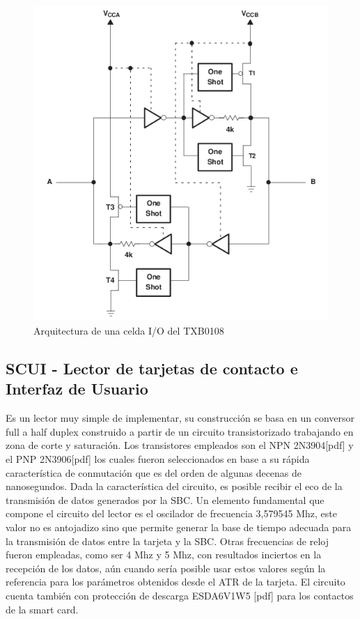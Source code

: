 \bigskip
\bigskip
\begin{figure}[H]
\centering
  \begin{center}
  \includegraphics[scale=.4]{Imagenes/TXB0108.png} 
  \end{center}
  \caption{Arquitectura de una celda I/O del TXB0108}\label{Fig:Celda_TXB0108} 
\end{figure}

\newpage
\subsection{SCUI - Lector de tarjetas de contacto e Interfaz de Usuario}


Es un lector muy simple de implementar, su construcción se basa en un conversor full a half duplex construido a partir de un circuito transistorizado trabajando en zona de corte y saturación. Los transistores empleados son el NPN 2N3904[pdf] y el PNP 2N3906[pdf] los cuales fueron seleccionados en base a su rápida característica de conmutación que es del orden de algunas decenas de nanosegundos. Dada la característica del circuito, es posible recibir el eco de la transmisión de datos generados por la SBC. 
Un elemento fundamental que compone el circuito del lector es el oscilador de frecuencia 3,579545 Mhz, este valor no es antojadizo sino que permite generar la base de tiempo adecuada para la transmisión de datos entre la tarjeta y la SBC. Otras frecuencias de reloj fueron empleadas, como ser 4 Mhz y 5 Mhz, con resultados inciertos en la recepción de los datos, aún cuando sería posible usar estos valores según la referencia \cite{SCHb} para los parámetros obtenidos desde el ATR de la tarjeta. 
El circuito cuenta también con protección de descarga ESDA6V1W5 [pdf] para los contactos de la smart card.

